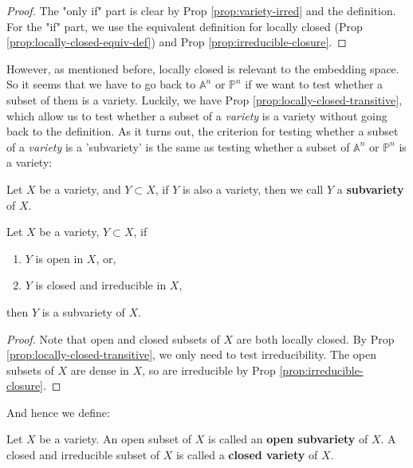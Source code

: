 \documentclass{note-eng}
\begin{document}
\begin{proof}
    The "only if" part is clear by Prop \ref{prop:variety-irred} and the definition. For the "if" part, we use the equivalent definition for locally closed (Prop \ref{prop:locally-closed-equiv-def}) and Prop \ref{prop:irreducible-closure}.
\end{proof}

However, as mentioned before, locally closed is relevant to the embedding space. So it seems that we have to go back to $\mathbb{A}^n$ or $\mathbb{P}^n$ if we want to test whether a subset of them is a variety. Luckily, we have Prop \ref{prop:locally-closed-transitive}, which allow us to test whether a subset of a \textit{variety} is a variety without going back to the definition. As it turns out, the criterion for testing whether a subset of a \textit{variety} is a 'subvariety' is the same as testing whether a subset of $\mathbb{A}^n$ or $\mathbb{P}^n$ is a variety:

\begin{definition}[Subvariety]
    Let $X$ be a variety, and $Y \subset X$, if $Y$ is also a variety, then we call $Y$ a \textbf{subvariety} of $X$.
\end{definition}

\begin{proposition}\label{prop:open-closed-subvariety}
    Let $X$ be a variety, $Y \subset X$, if
    \begin{enumerate}
        \item $Y$ is open in $X$, or,
        \item $Y$ is closed and irreducible in $X$,
    \end{enumerate}
    then $Y$ is a subvariety of $X$.
\end{proposition}

\begin{proof}
    Note that open and closed subsets of $X$ are both locally closed. By Prop \ref{prop:locally-closed-transitive}, we only need to test irreducibility. The open subsets of $X$ are dense in $X$, so are irreducible by Prop \ref{prop:irreducible-closure}.
\end{proof}

And hence we define:

\begin{definition}
    Let $X$ be a variety. An open subset of $X$ is called an \textbf{open subvariety} of $X$. A closed and irreducible subset of $X$ is called a \textbf{closed variety} of $X$.
\end{definition}
\end{document}

